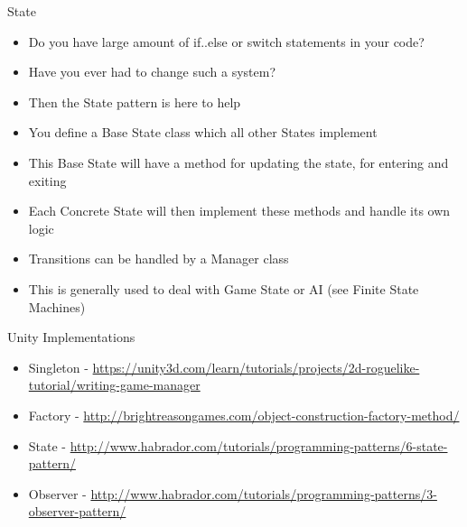 \begin{frame}{State}
	\begin{itemize}
		\item Do you have large amount of if..else or switch statements in your code?
		\item Have you ever had to change such a system?
		\item Then the State pattern is here to help
		\item You define a Base State class which all other States implement
		\item This Base State will have a method for updating the state, for entering and exiting
		\item Each Concrete State will then implement these methods and handle its own logic 
		\item Transitions can be handled by a Manager class
		\item This is generally used to deal with Game State or AI (see Finite State Machines)
	\end{itemize}
\end{frame}

\begin{frame}{Unity Implementations}
	\begin{itemize}
		\item Singleton - \url{https://unity3d.com/learn/tutorials/projects/2d-roguelike-tutorial/writing-game-manager}
		\item Factory - \url{http://brightreasongames.com/object-construction-factory-method/}
		\item State - \url{http://www.habrador.com/tutorials/programming-patterns/6-state-pattern/}
		\item Observer -
		\url{http://www.habrador.com/tutorials/programming-patterns/3-observer-pattern/}
		
	\end{itemize}
\end{frame}